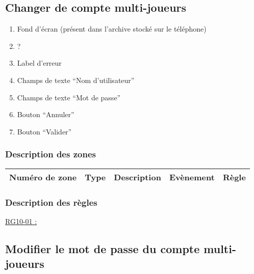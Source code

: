\documentclass{report}
\begin{document}
\newpage

	\subsection{Changer de compte multi-joueurs}
		
		\hypertarget{Changer de compte multi-joueurs}{}
		\label{Changer de compte multi-joueurs}
			
		\begin{center}
			
		\end{center}
		
		\begin{enumerate}
		  \item Fond d'écran (présent dans l'archive stocké sur le téléphone)
		  \item ?
		  \item Label d'erreur
		  \item Champs de texte ``Nom d'utilisateur''
		  \item Champs de texte ``Mot de passe''
		  \item Bouton ``Annuler''
		  \item Bouton ``Valider''
		\end{enumerate}

		\subsubsection{Description des zones}
		
			\begin{tabular}{|c|c|c|c|c|} \hline
				Numéro de zone & Type  & Description & Evènement &	Règle \\\hline
			\end{tabular}
			
		\subsubsection{Description des règles}

			\underline{RG10-01 :}
				\begin{quote}

				\end{quote}


\newpage

	\subsection{Modifier le mot de passe du compte multi-joueurs}
		
\end{document}
